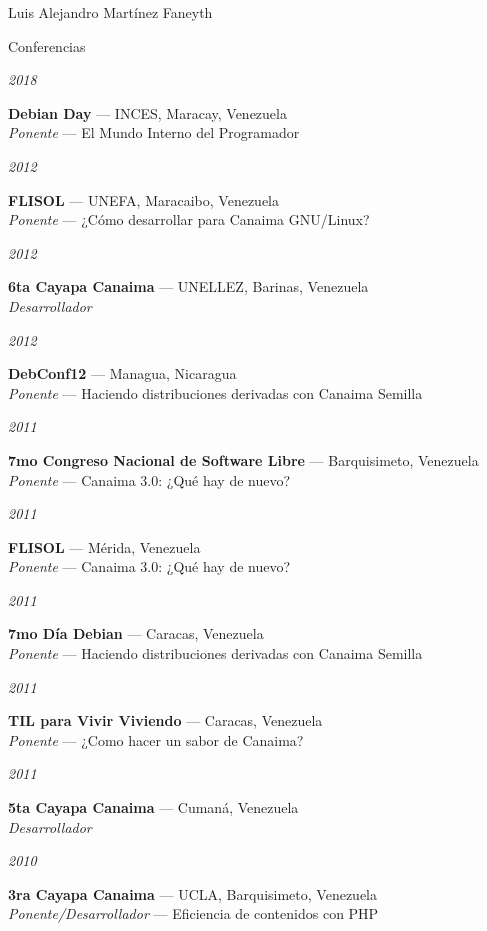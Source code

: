 \documentclass[10pt,letterpaper]{article}
\begin{document}
\begin{cv}{Luis Alejandro Mart\'inez Faneyth}
\begin{cvlist}{Conferencias}
\item[{\parbox[t]{6em}{\textit{\large{2018}}}}]{
	\parbox[t]{\linewidth}{
		\textbf{Debian Day} --- INCES, Maracay, Venezuela\\
		\textit{Ponente} --- El Mundo Interno del Programador
	}
}
\item[{\parbox[t]{6em}{\textit{\large{2012}}}}]{
	\parbox[t]{\linewidth}{
		\textbf{FLISOL} --- UNEFA, Maracaibo, Venezuela\\
		\textit{Ponente} --- ¿C\'omo desarrollar para Canaima GNU/Linux?
	}
}
\item[{\parbox[t]{6em}{\textit{\large{2012}}}}]{
	\parbox[t]{\linewidth}{
		\textbf{6ta Cayapa Canaima} --- UNELLEZ, Barinas, Venezuela\\
		\textit{Desarrollador}
	}
}
\item[{\parbox[t]{6em}{\textit{\large{2012}}}}]{
	\parbox[t]{\linewidth}{
		\textbf{DebConf12} --- Managua, Nicaragua\\
		\textit{Ponente} --- Haciendo distribuciones derivadas con Canaima Semilla
	}
}
\item[{\parbox[t]{6em}{\textit{\large{2011}}}}]{
	\parbox[t]{\linewidth}{
		\textbf{7mo Congreso Nacional de Software Libre} --- Barquisimeto, Venezuela\\
		\textit{Ponente} --- Canaima 3.0: ¿Qu\'e hay de nuevo?
	}
}
\item[{\parbox[t]{6em}{\textit{\large{2011}}}}]{
	\parbox[t]{\linewidth}{
		\textbf{FLISOL} --- M\'erida, Venezuela\\
		\textit{Ponente} --- Canaima 3.0: ¿Qu\'e hay de nuevo?
	}
}
\item[{\parbox[t]{6em}{\textit{\large{2011}}}}]{
	\parbox[t]{\linewidth}{
		\textbf{7mo D\'ia Debian} --- Caracas, Venezuela\\
		\textit{Ponente} --- Haciendo distribuciones derivadas con Canaima Semilla
	}
}
\item[{\parbox[t]{6em}{\textit{\large{2011}}}}]{
	\parbox[t]{\linewidth}{
		\textbf{TIL para Vivir Viviendo} --- Caracas, Venezuela\\
		\textit{Ponente} --- ¿Como hacer un sabor de Canaima?
	}
}
\item[{\parbox[t]{6em}{\textit{\large{2011}}}}]{
	\parbox[t]{\linewidth}{
		\textbf{5ta Cayapa Canaima} --- Cuman\'a, Venezuela\\
		\textit{Desarrollador}
	}
}
\item[{\parbox[t]{6em}{\textit{\large{2010}}}}]{
	\parbox[t]{\linewidth}{
		\textbf{3ra Cayapa Canaima} --- UCLA, Barquisimeto, Venezuela\\
		\textit{Ponente/Desarrollador} --- Eficiencia de contenidos con PHP
	}
}
\end{cvlist}


\end{cv}
\end{document}
